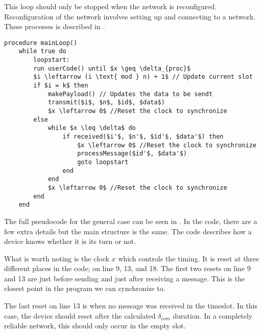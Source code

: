 
This loop should only be stopped when the network is reconfigured. 
Reconfiguration of the network involves setting up and connecting to a network. 
These processes is described in .

\begin{minipage}{\linewidth} %
\begin{lstlisting}[style=pseudocode,mathescape=true, label={lst:general_case}, caption={Pseudocode example of the main loop}] 
procedure mainLoop()
	while true do
		loopstart:
		run userCode() until $x \geq \delta_{proc}$
		$i \leftarrow (i \text{ mod } n) + 1$ // Update current slot
		if $i = k$ then
			makePayload() // Updates the data to be sendt
			transmit($i$, $n$, $id$, $data$)
			$x \leftarrow 0$ //Reset the clock to synchronize
		else 
			while $x \leq \delta$ do
				if received($i'$, $n'$, $id'$, $data'$) then
					$x \leftarrow 0$ //Reset the clock to synchronize
					processMessage($id'$, $data'$)
					goto loopstart
				end
			end
			$x \leftarrow 0$ //Reset the clock to synchronize
		end 
	end
\end{lstlisting}  
\end{minipage}

The full pseudocode for the general case can be seen in . 
In the code, there are a few extra details but the main structure is the same. 
The code describes how a device knows whether it is its turn or not. 

What is worth noting is the clock $x$ which controls the timing. 
It is reset at three different places in the code; on line 9, 13, and 18. 
The first two resets on line 9 and 13 are just before sending and just after receiving a message. 
This is the closest point in the program we can synchronize to. 

The last reset on line 13 is when no message was received in the timeslot. 
In this case, the device should reset after the calculated $\delta_{com}$ duration. 
In a completely reliable network, this should only occur in the empty slot.

            